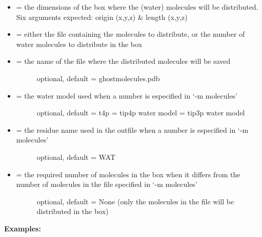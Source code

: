 \documentclass[letterpaper,10pt,english]{manual}
\begin{document}
\begin{itemize}
\item {} 
 = the dimensions of the box where the (water) molecules will be distributed. Six arguments expected: origin (x,y,z) \& length (x,y,z)

\item {} 
 = either the file containing the molecules to distribute, or the number of water molecules to distribute in the box

\item {} \begin{description}
\item[{ = the name of the file where the distributed molecules will be saved}] \leavevmode
optional, default = ghostmolecules.pdb

\end{description}

\item {} \begin{description}
\item[{ = the water model used when a number is especified in `-m molecules'}] \leavevmode
optional, default =  t4p
 = tip4p water model
 = tip3p water model

\end{description}

\item {} \begin{description}
\item[{ = the residue name used in the outfile when a number is especified in `-m molecules'}] \leavevmode
optional, default = WAT

\end{description}

\item {} \begin{description}
\item[{ = the required number of molecules in the box when it differs from the number of molecules in the file specified in `-m molecules'}] \leavevmode
optional, default = None (only the molecules in the file will be distributed in the box)

\end{description}

\end{itemize}

\textbf{Examples:}
\end{document}
